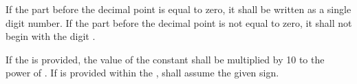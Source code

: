\specsubitem
If the part before the decimal point is equal to zero, it shall be written as a
single digit number. If the part before the decimal point is not equal to zero,
it shall not begin with the digit .

\specsubitem
If the  is provided, the value of the
constant shall be multiplied by 10 to the power of
. If  is provided within the
,  shall assume the given
sign.


\begin{grammar}
 \exactly \\
	   \\
	   \\
	   \\
	 
		 \\

 \exactly \\
	  \\

 \oneof \\
	 \\

 \exactly \\
	  \\

 \oneof \\
	 \\

 \exactly \\
	  \\

 \oneof \\
	 \\

 \oneof \\
	 \\
\end{grammar}

